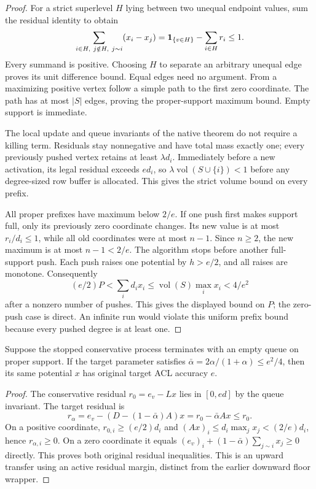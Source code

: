 \begin{proof}
For a strict superlevel $H$ lying between two unequal endpoint values,
sum the residual identity to obtain
\[
 \sum_{i\in H,\ j\notin H,\ j\sim i}(x_i-x_j)
 =\mathbf{1}_{\{v\in H\}}-\sum_{i\in H}r_i\leq1.
\]
Every summand is positive. Choosing $H$ to separate an arbitrary
unequal edge proves its unit difference bound. Equal edges need no
argument. From a maximizing positive vertex follow a simple path to
the first zero coordinate. The path has at most $|S|$ edges, proving
the proper-support maximum bound. Empty support is immediate.

The local update and queue invariants of the native theorem do not
require a killing term. Residuals stay nonnegative and have total mass
exactly one; every previously pushed vertex retains at least
$\lambda d_i$. Immediately before a new activation, its legal residual
exceeds $e d_i$, so $\lambda\operatorname{vol}(S\cup\{i\})<1$
before any degree-sized row buffer is allocated. This gives the strict
volume bound on every prefix.

All proper prefixes have maximum below $2/e$. If one push first makes
support full, only its previously zero coordinate changes. Its new
value is at most $r_i/d_i\leq1$, while all old coordinates were at
most $n-1$. Since $n\geq2$, the new maximum is at most $n-1<2/e$.
The algorithm stops before another full-support push. Each push raises
one potential by $h>e/2$, and all raises are monotone. Consequently
\[
 (e/2)P<\sum_i d_i x_i
 \leq\operatorname{vol}(S)\max_i x_i<4/e^2
\]
after a nonzero number of pushes. This gives the displayed bound on
$P$; the zero-push case is direct. An infinite run would violate this
uniform prefix bound because every pushed degree is at least one.
\end{proof}

\begin{lemma}
\label{lem:op3-conservative-upward-transfer}
Suppose the stopped conservative process terminates with an empty queue
on proper support. If the target parameter satisfies
$\bar\alpha=2\alpha/(1+\alpha)\leq e^2/4$, then its same potential
$x$ has original target ACL accuracy $e$.
\end{lemma}
\begin{proof}
The conservative residual $r_0=e_v-Lx$ lies in $[0,e d]$ by the
queue invariant. The target residual is
\[
 r_\alpha=e_v-(D-(1-\bar\alpha)A)x=r_0-\bar\alpha Ax\leq r_0.
\]
On a positive coordinate, $r_{0,i}\geq(e/2)d_i$ and
$(Ax)_i\leq d_i\max_jx_j<(2/e)d_i$, hence
$r_{\alpha,i}\geq0$. On a zero coordinate it equals
$(e_v)_i+(1-\bar\alpha)\sum_{j\sim i}x_j\geq0$ directly.
This proves both original residual inequalities. This is an upward
transfer using an active residual margin, distinct from the earlier
downward floor wrapper.
\end{proof}

